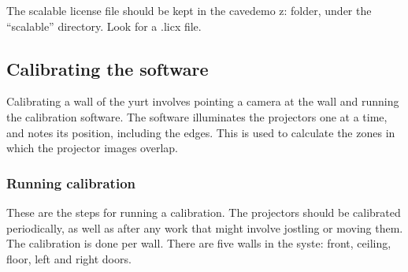 \documentclass[11pt]{article}
\begin{document}
The scalable license file should be kept in the cavedemo z: folder,
under the ``scalable'' directory.  Look for a .licx file.

\subsection{Calibrating the software}

Calibrating a wall of the yurt involves pointing a camera at the wall
and running the calibration software.  The software illuminates the
projectors one at a time, and notes its position, including the edges.
This is used to calculate the zones in which the projector images
overlap.

\subsubsection{Running calibration}

These are the steps for running a calibration.  The projectors should
be calibrated periodically, as well as after any work that might
involve jostling or moving them.  The calibration is done per wall.
There are five walls in the syste: front, ceiling, floor, left and
right doors.
\end{document}
